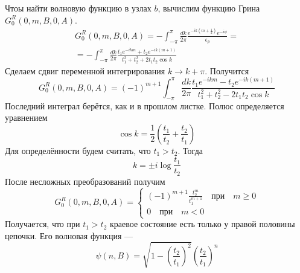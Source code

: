 Чтоы найти волновую функцию в узлах $b$, вычислим функцию Грина $G_0^R(0,m,B,0,A)$.
\begin{multline}
	G_0^R(0,m,B,0,A) = -\int_{-\pi}^{\pi} \frac{dk}{2\pi} 
			\frac{e^{-ik(m + \frac12)}e^{-i\phi}}{\epsilon_p} = \\
			= -\int_{-\pi}^{\pi} \frac{dk}{2\pi} 
			\frac{t_1e^{-ikm} + t_2e^{-ik(m+1)}}{t_1^2 + t_2^2 + 2t_1t_2 \cos{k}} 
\end{multline}
Сделаем сдвиг переменной интегрирования $k \to k + \pi$. Получится
\begin{equation}
	G_0^R(0,m,B,0,A) = (-1)^{m+1}\int_{-\pi}^{\pi} \frac{dk}{2\pi}
		\frac{t_1e^{-ikm} - t_2e^{-ik(m+1)}}{t_1^2 + t_2^2 - 2t_1t_2 \cos{k}} 
\end{equation}
Последний интеграл берётся, как и в прошлом листке. Полюс определяется уравнением
\begin{equation}
	\cos{k} = \frac12 \left(\frac{t_1}{t_2} + \frac{t_2}{t_1}\right)
\end{equation}
Для определённости будем считать, что $t_1 > t_2$. Тогда 
\begin{equation}
	k = \pm i\log\frac{t_1}{t_2}
\end{equation}
После несложных преобразований получим
\begin{equation}
	G_0^R(0,m,B,0,A) =
	\left\{
	\begin{matrix}
		(-1)^{m+1} \frac{t_2^m}{t_1^{m+1}} \quad \mbox{при} \quad m \ge 0 \\
		0 \quad \mbox{при} \quad m < 0
	\end{matrix}
	\right.
\end{equation}
Получается, что при $t_1 > t_2$ краевое состояние есть только у правой половины цепочки.
Его волновая функция ---
\begin{equation}
	\psi(n, B) = \sqrt{1 - \left(\frac{t_2}{t_1}\right)^2} \left(\frac{t_2}{t_1}\right)^n
\end{equation}
